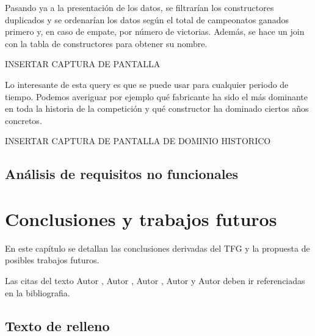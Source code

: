 \documentclass[12pt,twoside,titlepage]{report}
\newcommand\blankpage{%
    \newpage
    \null
    \thispagestyle{empty}%
    \newpage}
\begin{document}
Pasando ya a la presentación de los datos, se filtrarían los constructores duplicados y se ordenarían los datos según el total de campeonatos ganados primero y, en caso de empate, por número de victorias. Además, se hace un join con la tabla de constructores para obtener su nombre.

INSERTAR CAPTURA DE PANTALLA

Lo interesante de esta query es que se puede usar para cualquier periodo de tiempo. Podemos averiguar por ejemplo qué fabricante ha sido el más dominante en toda la historia de la competición y qué constructor ha dominado ciertos años concretos.

INSERTAR CAPTURA DE PANTALLA DE DOMINIO HISTORICO



\section{Análisis de requisitos no funcionales}







\chapter{Conclusiones y trabajos futuros}

En este capítulo se detallan las conclusiones derivadas del TFG y la propuesta de posibles trabajos futuros.

Las citas del texto Autor \cite{giaquinta}, Autor \cite{fortune}, Autor \cite{fortuneB}, Autor \cite{mitchell} y Autor \cite{morrey} deben ir referenciadas en la bibliografia.


\section{Texto de relleno}

\lipsum[1-18]
\blankpage










{}

\footnotesize{
%


}
\end{document}
